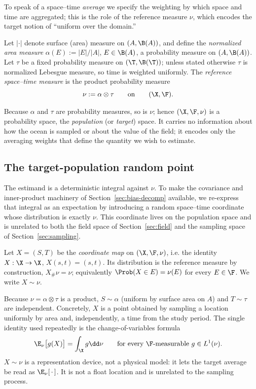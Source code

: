 To speak of a space--time \emph{average} we specify the weighting by
which space and time are aggregated; this is the role of the reference
measure $\nu$, which encodes the target notion of ``uniform over the
domain.''

\begin{definition}
\label{def:nu}
Let $|\cdot|$ denote surface (area) measure on $(A,\B(A))$, and define
the \emph{normalized area measure} $\alpha(E) := |E|/|A|$,
$E \in \B(A)$, a probability measure on $(A,\B(A))$. Let $\tau$ be a
fixed probability measure on $(\T,\B(\T))$; unless stated otherwise
$\tau$ is normalized Lebesgue measure, so time is weighted uniformly.
The \emph{reference space--time measure} is the product probability
measure
\[
  \nu := \alpha \otimes \tau \qquad\text{on}\qquad (\X,\F).
\]
\end{definition}

Because $\alpha$ and $\tau$ are probability measures, so is $\nu$;
hence $(\X,\F,\nu)$ is a probability space, the \emph{population} (or
\emph{target}) space. It carries no information about how the ocean is
sampled or about the value of the field; it encodes only the averaging
weights that define the quantity we wish to estimate.

\subsection{The target-population random point}
\label{sec:random-point}

The estimand is a deterministic integral against $\nu$. To make the
covariance and inner-product machinery of Section~\ref{sec:bias-decomp}
available, we re-express that integral as an expectation by introducing
a random space--time coordinate whose distribution is exactly $\nu$. This
coordinate lives on the population space and is unrelated to both the
field space of Section~\ref{sec:field} and the sampling space of
Section~\ref{sec:sampling}.

\begin{definition}
\label{def:X}
Let $X = (S,T)$ be the \emph{coordinate map} on $(\X,\F,\nu)$, i.e. the
identity $X : \X \to \X$, $X(s,t) = (s,t)$. Its distribution is the reference
measure by construction, $X_{\#}\nu = \nu$; equivalently
$\Prob(X \in E) = \nu(E)$ for every $E \in \F$. We write $X \sim \nu$.
\end{definition}

Because $\nu = \alpha\otimes\tau$ is a product, $S \sim \alpha$
(uniform by surface area on $A$) and $T \sim \tau$ are independent.
Concretely, $X$ is a point obtained by sampling a location uniformly by
area and, independently, a time from the study period. The single
identity used repeatedly is the change-of-variables formula
\begin{equation}
  \E_\nu\big[g(X)\big] = \int_\X g \dd\nu
  \qquad\text{for every $\F$-measurable } g \in L^1(\nu).
  \label{eq:cov}
\end{equation}
$X \sim \nu$ is a representation device, not a physical model: it lets
the target average be read as $\E_\nu[\,\cdot\,]$. It is not a float
location and is unrelated to the sampling process.


